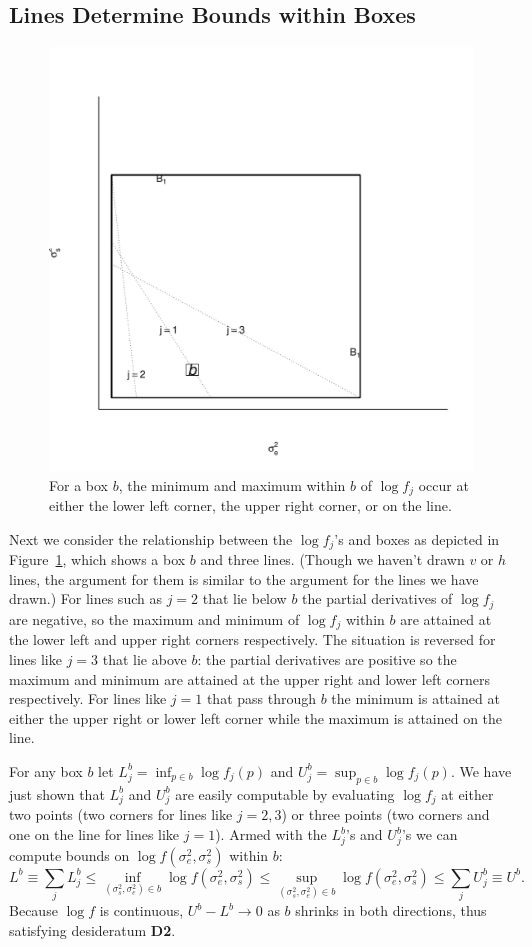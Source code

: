 \documentclass{report}
\newcommand{\RL}{f}
\newcommand{\logRL}{\log\RL}
\newcommand{\sigssq}{\sigma_s^2}
\newcommand{\sigesq}{\sigma_e^2}
\newcommand{\logRLss}{\logRL(\sigesq,\sigssq)}
\begin{document}
\subsection{Lines Determine Bounds within Boxes}
\begin{figure}
	\centering
	\includegraphics[width=.5\linewidth]{figs/boxb.pdf}
	\caption{For a box $b$,  the minimum and
	maximum within $b$ of $\logRL_j$
	occur at either the lower left corner, the upper right  corner, or
	on the line.
}	\label{fig:boxb}
\end{figure}
Next we consider the relationship between the $\logRL_j$'s and boxes as depicted in Figure~\ref{fig:boxb}, which shows a box $b$ and three lines.  (Though we haven't drawn $v$ or $h$ lines, the argument for them is similar to the argument for the lines we have drawn.)  For lines such as $j=2$ that lie below $b$ the partial derivatives of $\logRL_j$ are negative, so the maximum and minimum of $\logRL_j$ within $b$ are attained at the lower left and upper right corners respectively.  The situation is reversed for lines like $j=3$ that lie above $b$: the partial derivatives are positive so the maximum and minimum are attained at the upper right and lower left corners respectively.  For lines like $j=1$ that pass through $b$ the minimum is attained at either the upper right or lower left corner while the maximum is attained on the line.

For any box $b$ let $L^b_j = \inf_{p\in b} \logRL_j(p)$ and $U^b_j = \sup_{p\in b} \logRL_j(p)$.  We have just shown that $L^b_j$ and $U^b_j$ are easily computable by evaluating $\logRL_j$ at either two points (two corners for lines like $j=2,3$) or three points (two corners and one on the line for lines like $j=1$).
Armed with the $L^b_j$'s and $U^b_j$'s we can compute bounds on $\logRLss$ within $b$:
\begin{equation}
	L^b \equiv \sum_j L^b_j \le \inf_{(\sigssq,\sigesq)\in b} \logRLss \le
	\sup_{(\sigssq,\sigesq)\in b} \logRLss \le \sum_j U^b_j \equiv U^b.
\label{eq:bounds}
\end{equation}
Because $\logRL$ is continuous, $U^b - L^b \rightarrow 0$ as $b$ shrinks in both directions, thus satisfying desideratum \textbf{D2}.
\end{document}
